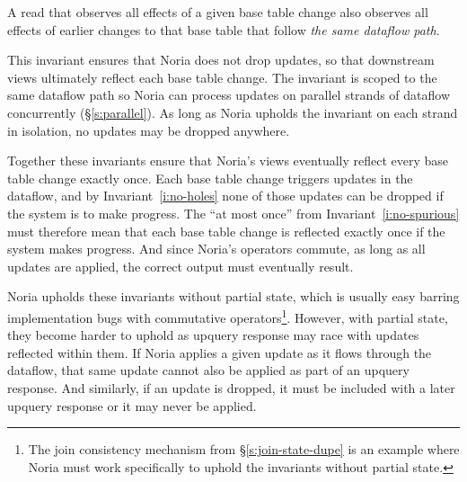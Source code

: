 
\begin{invariant}
  \label{i:no-holes}
  A read that observes all effects of a given base table change also observes
  all effects of earlier changes to that base table that follow \emph{the same
  dataflow path}.
\end{invariant}

This invariant ensures that Noria does not drop updates, so that downstream
views ultimately reflect each base table change. The invariant is scoped to the
same dataflow path so Noria can process updates on parallel strands of dataflow
concurrently (\S\ref{s:parallel}). As long as Noria upholds the invariant on
each strand in isolation, no updates may be dropped anywhere.

Together these invariants ensure that Noria's views eventually reflect every
base table change exactly once. Each base table change triggers updates in the
dataflow, and by Invariant~\ref{i:no-holes} none of those updates can be dropped
if the system is to make progress. The ``at most once'' from
Invariant~\ref{i:no-spurious} must therefore mean that each base table change is
reflected exactly once if the system makes progress. And since Noria's operators
commute, as long as all updates are applied, the correct output must eventually
result.

Noria upholds these invariants without partial state, which is usually easy
barring implementation bugs with commutative operators\footnote{The join
consistency mechanism from \S\ref{s:join-state-dupe} is an example where Noria
must work specifically to uphold the invariants without partial state.}.
However, with partial state, they become harder to uphold as upquery response
may race with updates reflected within them. If Noria applies a given update as
it flows through the dataflow, that same update cannot also be applied as part
of an upquery response. And similarly, if an update is dropped, it must be
included with a later upquery response or it may never be applied.

